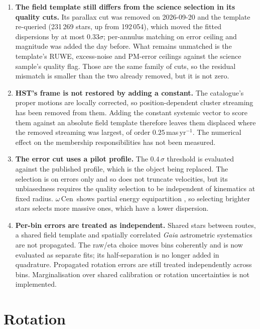 \documentclass[11pt,a4paper]{article}
\newcommand{\masyr}{mas\,yr$^{-1}$}
\newcommand{\ocen}{$\omega$\,Cen}
\begin{document}
\begin{enumerate}
\item \textbf{The field template still differs from the science selection in its quality
      cuts.} Its parallax cut was removed on 2026-09-20 and the template re-queried
      (231\,269 stars, up from 192\,054), which moved the fitted dispersions by at most
      $0.33\sigma$; per-annulus matching on error ceiling and magnitude was added the day
      before. What remains unmatched is the template's RUWE, excess-noise and PM-error
      ceilings against the science sample's quality flag. Those are the same family of cuts,
      so the residual mismatch is smaller than the two already removed, but it is not zero.
\item \textbf{HST's frame is not restored by adding a constant.} The catalogue's proper
      motions are locally corrected, so position-dependent cluster streaming has been removed
      from them. Adding the constant systemic vector to score them against an absolute field
      template therefore leaves them displaced where the removed streaming was largest, of
      order $0.25$\,\masyr. The numerical effect on the membership responsibilities has not
      been measured.
\item \textbf{The error cut uses a pilot profile.} The $0.4\,\sigma$ threshold is evaluated
      against the published profile, which is the object being replaced. The selection is on
      errors only and so does not truncate velocities, but its unbiasedness requires the
      quality selection to be independent of kinematics at fixed radius. \ocen\ shows partial
      energy equipartition \citep{haeberle2025}, so selecting brighter stars selects more
      massive ones, which have a lower dispersion.
\item \textbf{Per-bin errors are treated as independent.} Shared stars between routes, a
      shared field template and spatially correlated \emph{Gaia} astrometric systematics are
      not propagated. The raw/eta choice moves bins coherently and is now evaluated as separate fits;
      its half-separation is no longer added in quadrature. Propagated rotation errors are
      still treated independently across bins. Marginalisation over shared calibration
      or rotation uncertainties is not implemented.
\end{enumerate}

\section{Rotation}
\end{document}
